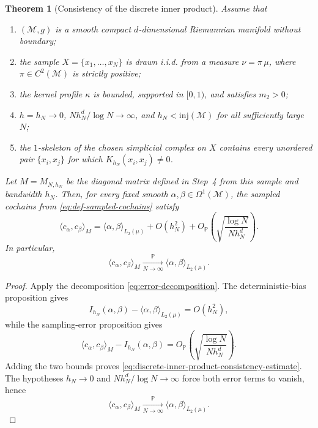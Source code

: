 \documentclass[a4paper,11pt, DIV=10]{scrartcl}
\numberwithin{equation}{section}
\newtheorem{theorem}{Theorem}[section]
\theoremstyle{definition}
\theoremstyle{remark}
\newcommand{\mc}[1]{\mathcal{#1}}
\begin{document}
\begin{theorem}[Consistency of the discrete inner product]
\label{thm:discrete-inner-product-consistency}
Assume that
\begin{enumerate}
\item $(\mc{M},g)$ is a smooth compact $d$-dimensional Riemannian manifold without boundary;
\item the sample $X=\{x_1,\dots,x_N\}$ is drawn i.i.d. from a measure $\nu=\pi\,\mu$, where $\pi\in C^2(\mc{M})$ is strictly positive;
\item the kernel profile $\kappa$ is bounded, supported in $[0,1)$, and satisfies $m_2>0$;
\item $h=h_N\to 0$, $N h_N^d/\log N\to \infty$, and $h_N<\mathrm{inj}(\mc{M})$ for all sufficiently large $N$;
\item the $1$-skeleton of the chosen simplicial complex on $X$ contains every unordered pair $\{x_i,x_j\}$ for which $K_{h_N}(x_i,x_j)\neq 0$.
\end{enumerate}
Let $M=M_{N,h_N}$ be the diagonal matrix defined in Step~4 from this sample and bandwidth $h_N$.
Then, for every fixed smooth $\alpha,\beta\in \Omega^1(\mc{M})$, the sampled cochains from \eqref{eq:def-sampled-cochains} satisfy
\begin{equation}
\label{eq:discrete-inner-product-consistency-estimate}
\langle c_\alpha,c_\beta\rangle_M
=
\langle \alpha,\beta\rangle_{L_2(\mu)}
+ O(h_N^2)
+ O_{\mathbb P}\!\left(\sqrt{\frac{\log N}{N h_N^d}}\right).
\end{equation}
In particular,
\begin{equation}
\langle c_\alpha,c_\beta\rangle_M
\xrightarrow[N\to\infty]{\mathbb{P}}
\langle \alpha,\beta\rangle_{L_2(\mu)}.
\end{equation}
\end{theorem}
\begin{proof}
Apply the decomposition \eqref{eq:error-decomposition}. The deterministic-bias proposition gives
\begin{equation}
I_{h_N}(\alpha,\beta)-\langle \alpha,\beta\rangle_{L_2(\mu)}=O(h_N^2),
\end{equation}
while the sampling-error proposition gives
\begin{equation}
\langle c_\alpha,c_\beta\rangle_M-I_{h_N}(\alpha,\beta)
=
O_{\mathbb P}\!\left(\sqrt{\frac{\log N}{N h_N^d}}\right).
\end{equation}
Adding the two bounds proves \eqref{eq:discrete-inner-product-consistency-estimate}. The hypotheses $h_N\to 0$ and $N h_N^d/\log N\to \infty$ force both error terms to vanish, hence
\begin{equation}
\langle c_\alpha,c_\beta\rangle_M\xrightarrow[N\to\infty]{\mathbb{P}}\langle \alpha,\beta\rangle_{L_2(\mu)}.
\end{equation}
\end{proof}
\end{document}
